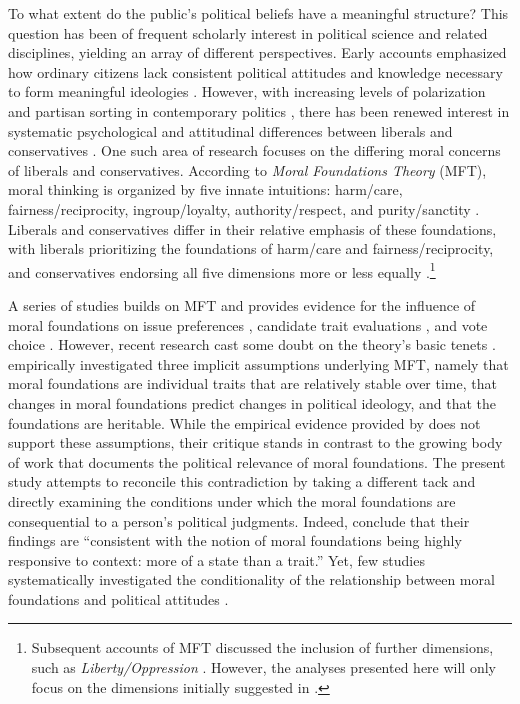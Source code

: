 \documentclass[12pt]{article}
\begin{document}
To what extent do the public's political beliefs have a meaningful structure? This question has been of frequent scholarly interest in political science and related disciplines, yielding an array of different perspectives. Early accounts emphasized how ordinary citizens lack consistent political attitudes and knowledge necessary to form meaningful ideologies \citep{converse1964nature}. However, with increasing levels of polarization and partisan sorting in contemporary politics \citep[e.g.][]{mason2014disrespectfully}, there has been renewed interest in systematic psychological and attitudinal differences between liberals and conservatives \citep{jost2006end}. One such area of research focuses on the differing moral concerns of liberals and conservatives. According to \textit{Moral Foundations Theory} (MFT), moral thinking is organized by five innate intuitions: harm/care, fairness/reciprocity, ingroup/loyalty, authority/respect, and purity/sanctity \citep{haidt2008moral,graham2011mapping}. Liberals and conservatives differ in their relative emphasis of these foundations, with liberals prioritizing the foundations of harm/care and fairness/reciprocity, and conservatives endorsing all five dimensions more or less equally \citep{graham2009liberals}.\footnote{Subsequent accounts of MFT discussed the inclusion of further dimensions, such as \textit{Liberty/Oppression} \citep[c.f.,][]{graham2013moral,haidt2012righteous}. However, the analyses presented here will only focus on the dimensions initially suggested in \citet{haidt2008moral}.}

A series of studies builds on MFT and provides evidence for the influence of moral foundations on issue preferences \citep{koleva2012tracing, kertzer2014moral, low2015moral, clifford2015concerns}, candidate trait evaluations \citep{clifford2014linking}, and vote choice \citep{iyer2010beyond, franks2015using}. However, recent research cast some doubt on the theory's basic tenets \citep[e.g.,][]{suhler2011can}. \citet{smith2016intuitive} empirically investigated three implicit assumptions underlying MFT, namely that moral foundations are individual traits that are relatively stable over time, that changes in moral foundations predict changes in political ideology, and that the foundations are heritable. While the empirical evidence provided by \citet{smith2016intuitive} does not support these assumptions, their critique stands in contrast to the growing body of work that documents the political relevance of moral foundations. The present study attempts to reconcile this contradiction by taking a different tack and directly examining the conditions under which the moral foundations are consequential to a person's political judgments. Indeed, \citet{smith2016intuitive} conclude that their findings are ``consistent with the notion of moral foundations being highly responsive to context: more of a state than a trait.'' Yet, few studies systematically investigated the conditionality of the relationship between moral foundations and political attitudes \citep[see][for a notable exception]{clifford2015concerns}.
\end{document}
